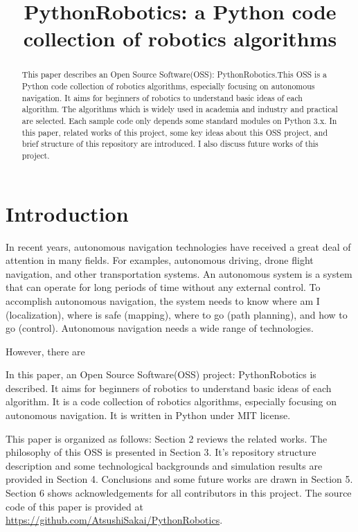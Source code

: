 \documentclass{bmvc2k}
\title{PythonRobotics: a Python code collection of robotics algorithms}
\begin{document}
\maketitle

\begin{abstract}
This paper describes an Open Source Software(OSS): PythonRobotics\cite{github}.This OSS is a Python code collection of robotics algorithms, especially focusing on autonomous navigation. It aims for beginners of robotics to understand basic ideas of each algorithm. The algorithms which is widely used in academia and industry and practical are selected. Each sample code only depends some standard modules on Python 3.x. In this paper, related works of this project, some key ideas about this OSS project, and brief structure of this repository are introduced. I also discuss future works of this project. 

\end{abstract}

\section{Introduction}

In recent years, autonomous navigation technologies have received a great deal of attention in many fields. 
For examples, autonomous driving\cite{pathplanning}, drone flight navigation, and other transportation systems.
An autonomous system is a system that can operate for long periods of time without any external control.
To accomplish autonomous navigation, the system needs to know where am I (localization), where is safe (mapping), where to go (path planning), and how to go (control). 
Autonomous navigation needs a wide range of technologies.




However, there are 

In this paper, an Open Source Software(OSS) project: PythonRobotics\cite{github} is described.
It aims for beginners of robotics to understand basic ideas of each algorithm.
It is a code collection of robotics algorithms, especially focusing on autonomous navigation. It is written in Python\cite{python} under MIT license\cite{mit}. 

This paper is organized as follows: Section 2 reviews the related works. The philosophy of this OSS is presented in Section 3. It's repository structure description and some technological backgrounds and simulation results are provided in Section 4. Conclusions and some future works are drawn in Section 5. Section 6 shows acknowledgements for all contributors  in this project. The source code of this paper is provided at \url{https://github.com/AtsushiSakai/PythonRobotics}.
\end{document}
